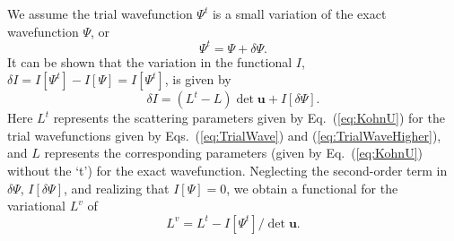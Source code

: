 \documentclass[preprint,showpacs,showkeys,preprintnumbers,amsmath,amssymb,longbibliography,pra,aps]{revtex4-1}
\begin{document}
{We assume the trial wavefunction $\Psi^t$ is a small variation of the exact
wavefunction
$\Psi$, or
\begin{equation}
\Psi^t = \Psi + \delta \Psi.
\label{eq:PsiTrialRelation}
\end{equation}
It can be shown that the variation in the functional $I$,
$\delta I = I[\Psi^t] - I[\Psi] = I[\Psi^t]$,
is given by
\begin{equation}
\delta I = (L^t - L) \det \textbf{u} + I[\delta \Psi].
\label{eq:IlPsiVariation}
\end{equation}
Here $L^t$ represents the scattering parameters given by Eq.~(\ref{eq:KohnU})
for the trial wavefunctions given by Eqs.~(\ref{eq:TrialWave}) and
(\ref{eq:TrialWaveHigher}), and $L$ represents the corresponding parameters
(given by Eq.~(\ref{eq:KohnU}) without the `t') for the exact wavefunction.
Neglecting the second-order term in $\delta \Psi$, $I[\delta \Psi]$, and realizing that
$I[\Psi] = 0$, we obtain a functional for the variational $L^v$ of
\begin{equation}
L^v = L^t - I[\Psi^t] / \det \textbf{u}.
\label{eq:ComplexKohnVariation}
\end{equation}

}
\end{document}
